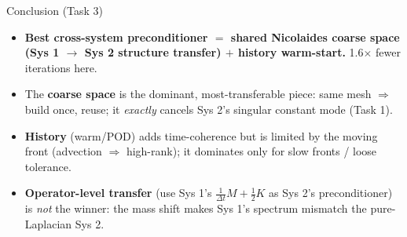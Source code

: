 \documentclass[aspectratio=169,10pt]{beamer}
\begin{document}
\begin{frame}{Conclusion (Task 3)}
\begin{itemize}\itemsep0.35em
  \item \textbf{Best cross-system preconditioner $=$ shared Nicolaides coarse space (Sys 1 $\to$ Sys 2 structure transfer) $+$ history warm-start.} 1.6$\times$ fewer iterations here.
  \item The \textbf{coarse space} is the dominant, most-transferable piece: same mesh $\Rightarrow$ build once, reuse; it \emph{exactly} cancels Sys 2's singular constant mode (Task 1).
  \item \textbf{History} (warm/POD) adds time-coherence but is limited by the moving front (advection $\Rightarrow$ high-rank); it dominates only for slow fronts / loose tolerance.
  \item \textbf{Operator-level transfer} (use Sys 1's $\tfrac1{\Delta t}M+\tfrac12K$ as Sys 2's preconditioner) is \emph{not} the winner: the mass shift makes Sys 1's spectrum mismatch the pure-Laplacian Sys 2.
\end{itemize}
\end{frame}
\end{document}
